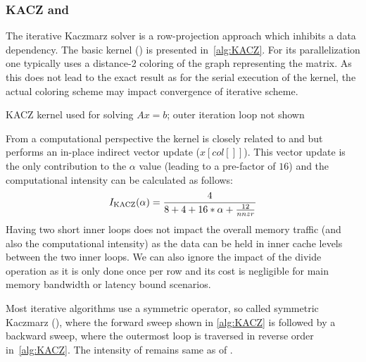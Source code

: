 \subsubsection{KACZ and \SYMMKACZ}
The iterative Kaczmarz solver is a row-projection approach which inhibits a data dependency. The basic kernel (\KACZ) is  presented in~\cref{alg:KACZ}. For its parallelization one typically uses a distance-2 coloring of the graph representing the matrix. As this does not lead to the exact result as for the serial execution of the kernel, the actual coloring scheme may impact convergence of iterative scheme.
\begin{algorithm}[H]
	\caption{KACZ kernel used for solving $Ax=b$; outer iteration loop not shown} 
	\label{alg:KACZ}
	\begin{algorithmic}[1]
		\ENDFOR
		\ENDFOR
		\ENDFOR
	\end{algorithmic}
\end{algorithm}
From a computational perspective the kernel is closely related to \SpMV and \SymmSpmv but performs an in-place indirect vector update ($x[col[]]$). This vector update is the only contribution to the $\alpha$ value (leading to a pre-factor of $16$) and the computational intensity can be calculated as follows:
\begin{equation}
\label{eq:KACZ_intensity}
I_\mathrm{KACZ} (\alpha)=  \frac{4}{8+4+16*\alpha+\frac{12}{nnzr}} \\%
\end{equation}
Having two short inner loops does not impact the overall memory traffic (and also the computational intensity) as the data can be held in inner cache levels between the two inner loops. We can also ignore the impact of the divide operation as it is only done once per row and its cost is negligible for main memory bandwidth or latency bound scenarios.  

Most iterative algorithms use a symmetric operator, so called symmetric Kaczmarz (\SYMMKACZ), where the forward sweep shown in \cref{alg:KACZ} is followed by a backward sweep, where the outermost loop is traversed in reverse order   in~\cref{alg:KACZ}. The intensity of \SYMMKACZ remains same as of \KACZ. 

